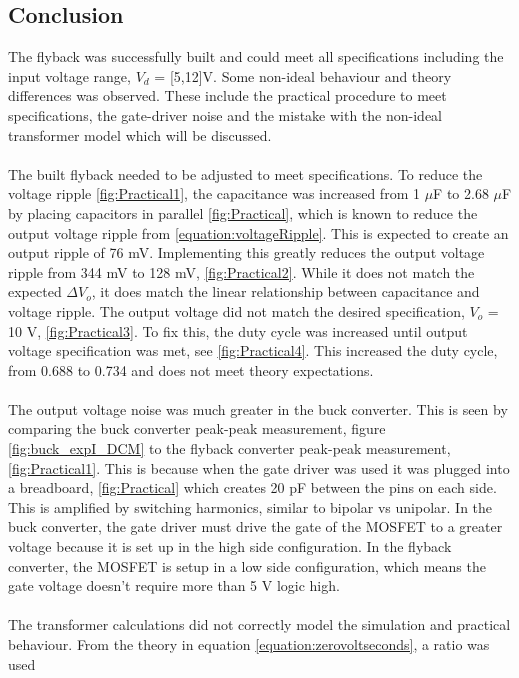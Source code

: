 \documentclass[12pt,twoside]{scrartcl}
\begin{document}
\subsection{Conclusion}
The flyback was successfully built and could meet all specifications 
including the input voltage range, $V_d$ = [5,12]V. 
Some non-ideal behaviour and theory differences was observed. 
These include the practical procedure to meet specifications, the gate-driver noise and the mistake with the
non-ideal transformer model which will be discussed. 
\\\\
The built flyback needed to be adjusted to meet specifications. To reduce the voltage ripple \ref{fig:Practical1}, the capacitance was increased 
from 1 $\mu$F to 2.68 $\mu$F by placing capacitors in parallel \ref{fig:Practical}, which is known to reduce
the output voltage ripple from \ref{equation:voltageRipple}. This is 
expected to create an output ripple of 76 mV. Implementing this greatly reduces the output voltage ripple from 344 mV to 128 mV, 
\ref{fig:Practical2}. While it does not match the expected $\Delta V_o$, it does match the linear 
relationship between capacitance and voltage ripple. The output voltage did not match the desired 
specification, $V_o$ = 10 V, \ref{fig:Practical3}. To fix this, the duty cycle was increased
until output voltage specification was met, see \ref{fig:Practical4}. This increased the duty cycle,
from 0.688 to 0.734 and does not meet theory expectations. 
\\\\
The output voltage noise was much greater in the buck converter. This is seen by comparing the buck converter peak-peak measurement, figure \ref{fig:buck_expI_DCM}
to the flyback converter peak-peak measurement, \ref{fig:Practical1}.  
This is because when the gate driver was used it was plugged into a breadboard, \ref{fig:Practical} which creates 20 pF between the pins on each side. This is amplified 
by switching harmonics, similar to bipolar vs unipolar. In the buck converter,
the gate driver must drive the gate of the MOSFET to a greater voltage because it is set up in the high side configuration. 
In the flyback converter, the MOSFET is setup in a low side configuration, which means the gate voltage doesn't require more than 5 V logic high.
\\\\
The transformer calculations did not correctly model the simulation and practical behaviour. From the theory in equation \ref{equation:zerovoltseconds}, a ratio was used 
\end{document}
